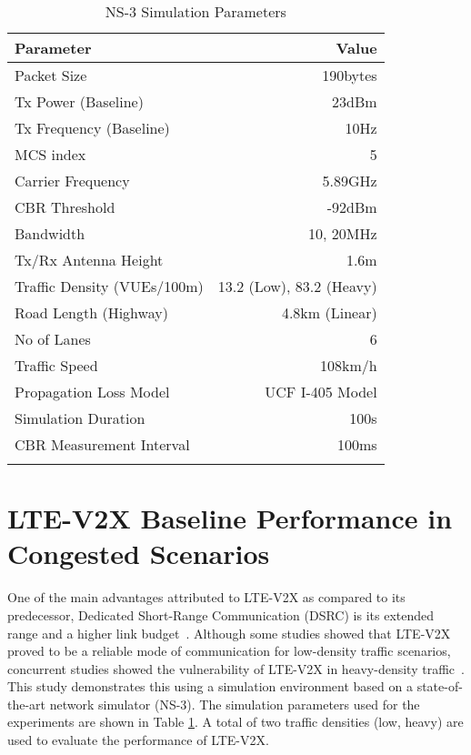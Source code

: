 \documentclass[iicol]{sn-jnl}%
\theoremstyle{thmstyleone}%
\theoremstyle{thmstyletwo}%
\theoremstyle{thmstylethree}%
\begin{document}
\begin{table}[t]
\setlength{\tabcolsep}{3pt}
\begin{center}
\caption{NS-3 Simulation Parameters}
\label{table:ns-3 sim params}
\begin{tabular}{l r}
\hline
Parameter & Value\\
\midrule
Packet Size & 190bytes\\
Tx Power (Baseline) & 23dBm\\
Tx Frequency (Baseline) & 10Hz\\
MCS index & 5\\
Carrier Frequency & 5.89GHz \\
CBR Threshold & -92dBm \\
Bandwidth & 10, 20MHz\\
Tx/Rx Antenna Height & 1.6m \\
Traffic Density (VUEs/100m) & 13.2 (Low), 83.2 (Heavy)\\
 Road Length (Highway) & 4.8km (Linear)\\
 No of Lanes & 6 \\ 
 Traffic Speed & 108km/h \\
 Propagation Loss Model & UCF I-405 Model \cite{ehsan_2020_channelmodel} \\
Simulation Duration & 100s\\
CBR Measurement Interval & 100ms\\

\botrule
\end{tabular}
\end{center}
\end{table}






\section{LTE-V2X Baseline Performance in Congested Scenarios}\label{sec3}
One of the main advantages attributed to LTE-V2X as compared to its predecessor, Dedicated Short-Range Communication (DSRC) \cite{kenney2011dedicated} is its extended range and a higher link budget~\cite{molina2017lte, saej2735}. Although some studies \cite{toghi2018multiple} showed that LTE-V2X proved to be a reliable mode of communication for low-density traffic scenarios, concurrent studies showed the vulnerability of LTE-V2X in heavy-density traffic~\cite{toghi2019analysis, yoon2020balancing}. This study demonstrates this using a simulation environment based on a state-of-the-art network simulator (NS-3). The simulation parameters used for the experiments are shown in Table \ref{table:ns-3 sim params}. A total of two traffic densities (low, heavy) are used to evaluate the performance of LTE-V2X.
\end{document}

